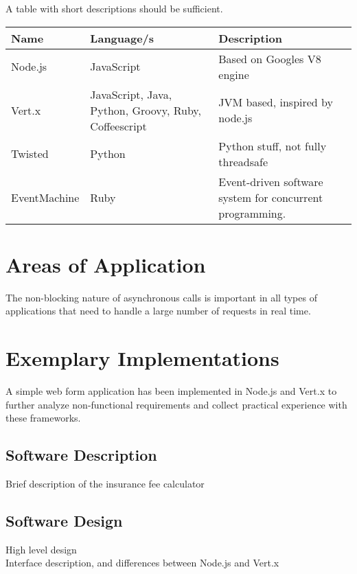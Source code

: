 A table with short descriptions should be sufficient.

\begin{table}[h]
\centering
\begin{tabular*}{\textwidth}{p{} p{} p{}}
\toprule
\textbf{Name} & \textbf{Language/s} & \textbf{Description} \\
\midrule
Node.js			& JavaScript		& Based on Googles V8 engine\\
Vert.x			& JavaScript, Java, Python, Groovy, Ruby, Coffeescript		
									& JVM based, inspired by node.js\\
Twisted			& Python			& Python stuff, not fully threadsafe\\
EventMachine	& Ruby				& Event-driven software system for concurrent programming.\\
\bottomrule 
\end{tabular*}
  \label{tab:existing_frameworks}
\end{table}



\section{Areas of Application}
\label{areas_of_application}

The non-blocking nature of asynchronous calls is important in all types of
applications that need to handle a large number of requests in real time.



\section{Exemplary Implementations}
\label{exemplary_implementations}

A simple web form application has been implemented in Node.js and Vert.x to
further analyze non-functional requirements and collect practical experience
with these frameworks.

\subsection{Software Description}
\label{software_description}
Brief description of the insurance fee calculator

\subsection{Software Design}
\label{software_design}
High level design\\
Interface description, and differences between Node.js and Vert.x

